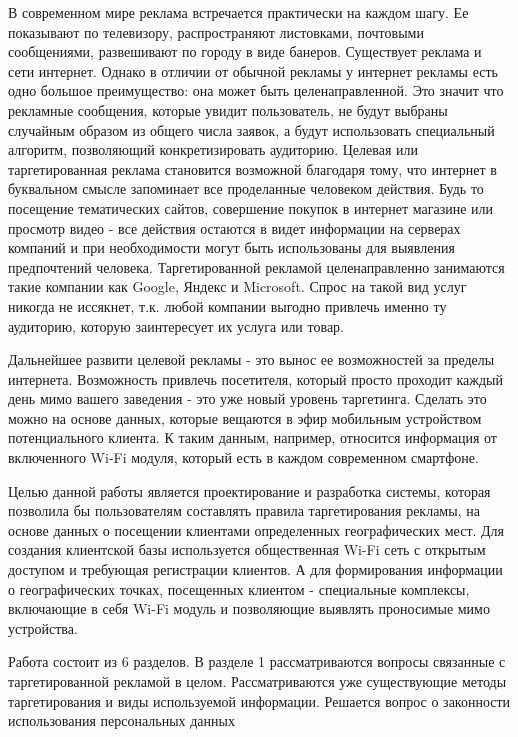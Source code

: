 \intro

В современном мире реклама встречается практически на каждом шагу. Ее показывают по телевизору, распространяют листовками, почтовыми сообщениями, развешивают по городу в виде банеров. Существует реклама и сети интернет. Однако в отличии от обычной рекламы у интернет рекламы есть одно большое преимущество: она может быть целенаправленной. Это значит что рекламные сообщения, которые увидит пользователь, не будут выбраны случайным образом из общего числа заявок, а будут использовать специальный алгоритм, позволяющий конкретизировать аудиторию. Целевая или таргетированная реклама становится возможной благодаря тому, что интернет в буквальном смысле запоминает все проделанные человеком действия. Будь то посещение тематических сайтов, совершение покупок в интернет магазине или просмотр видео - все действия остаются в видет информации на серверах компаний и при необходимости могут быть использованы для выявления предпочтений человека. Таргетированной рекламой целенаправленно занимаются такие компании как Google, Яндекс и Microsoft. Спрос на такой вид услуг никогда не иссякнет, т.к. любой компании выгодно привлечь именно ту аудиторию, которую заинтересует их услуга или товар.

Дальнейшее развити целевой рекламы - это вынос ее возможностей за пределы интернета. Возможность привлечь посетителя, который просто проходит каждый день мимо вашего заведения - это уже новый уровень таргетинга. Сделать это можно на основе данных, которые вещаются в эфир мобильным устройством потенциального клиента. К таким данным, например, относится информация от включенного Wi-Fi модуля, который есть в каждом современном смартфоне. 

Целью данной работы является проектирование и разработка системы, которая позволила бы пользователям составлять правила таргетирования рекламы, на основе данных о посещении клиентами определенных географических мест. Для создания клиентской базы используется общественная Wi-Fi сеть с открытым доступом и требующая регистрации клиентов. А для формирования информации о географических точках, посещенных клиентом - специальные комплексы, включающие в себя Wi-Fi модуль и позволяющие выявлять проносимые мимо устройства.

Работа состоит из 6 разделов. В разделе 1 рассматриваются вопросы связанные с таргетированной рекламой в целом. Рассматриваются уже существующие методы таргетирования и виды используемой информации. Решается вопрос о законности использования персональных данных

